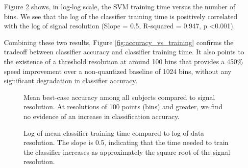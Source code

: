 

Figure \ref{fig:training_vs_bins} shows, in log-log scale, the SVM training time versus the number of bins. We see that the log of the classifier training time is positively correlated with the log of signal resolution (Slope = 0.5, R-squared = 0.947, p \textless 0.001). 

Combining these two results, Figure \ref{fig:accuracy_vs_training} confirms the tradeoff between classifier accuracy and classifier training time. It also points to the existence of a threshold resolution at around 100 bins that provides a 450\% speed improvement over a non-quantized baseline of 1024 bins, without any significant degradation in classifier accuracy.


\begin{figure}[!h]
  \centering
   {}
  \caption{Mean best-case accuracy among all subjects compared to signal resolution. At resolutions of 100 points (bins) and greater, we find no evidence of an increase in classification accuracy. }
  \label{fig:accuracy_vs_bins}
  \vspace{-0.1cm}
 \end{figure}

 \begin{figure}[!h]
  \vspace{-0.2cm}
  \centering
   {}
  \caption{Log of mean classifier training time compared to log of data resolution. The slope is 0.5, indicating that the time needed to train the classifier increases as approximately the square root of the signal resolution.}
  \label{fig:training_vs_bins}
  \vspace{-0.1cm}
 \end{figure}

